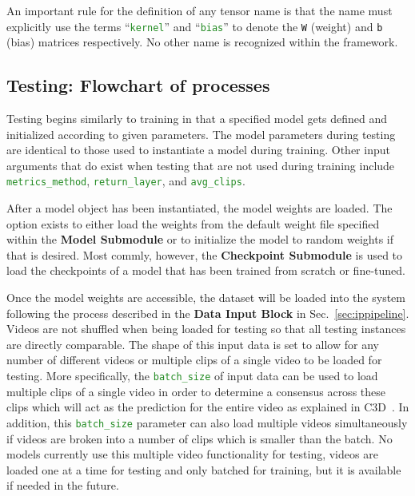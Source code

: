 \documentclass{llncs}
\begin{document}
An important rule for the definition of any tensor name is that the name must explicitly use the terms ``\texttt{\textcolor{ForestGreen}{kernel}}'' and ``\texttt{\textcolor{ForestGreen}{bias}}'' to denote the \texttt{W} (weight) and \texttt{b} (bias) matrices respectively.
No other name is recognized within the framework.

\subsection{Testing: Flowchart of processes}
\label{sec:testing}

Testing begins similarly to training in that a specified model gets defined and initialized according to given parameters.
The model parameters during testing are identical to those used to instantiate a model during training.
Other input arguments that do exist when testing that are not used during training include \texttt{\textcolor{ForestGreen}{metrics\_method}}, \texttt{\textcolor{ForestGreen}{return\_layer}}, and \texttt{\textcolor{ForestGreen}{avg\_clips}}.

After a model object has been instantiated, the model weights are loaded.
The option exists to either load the weights from the default weight file specified within the \textbf{Model Submodule} or to initialize the model to random weights if that is desired.
Most commly, however, the \textbf{Checkpoint Submodule} is used to load the checkpoints of a model that has been trained from scratch or fine-tuned.

Once the model weights are accessible, the dataset will be loaded into the system following the process described in the \textbf{Data Input Block} in Sec.~\ref{sec:ippipeline}.
Videos are not shuffled when being loaded for testing so that all testing instances are directly comparable.
The shape of this input data is set to allow for any number of different videos or multiple clips of a single video to be loaded for testing.
More specifically, the \texttt{\textcolor{ForestGreen}{batch\_size}} of input data can be used to load multiple clips of a single video in order to determine a consensus across these clips which will act as the prediction for the entire video as explained in C3D~\cite{}.
In addition, this \texttt{\textcolor{ForestGreen}{batch\_size}} parameter can also load multiple videos simultaneously if videos are broken into a number of clips which is smaller than the batch.
No models currently use this multiple video functionality for testing, videos are loaded one at a time for testing and only batched for training, but it is available if needed in the future.
\end{document}
